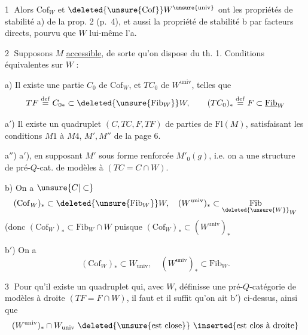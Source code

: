 \textcircled{1} Alors $\mathrm{Cof}_{W}$ et $\deleted{\unsure{\mathrm{Cof}}}W^{\unsure{\mathrm{univ}}}$ ont les
propriétés de stabilité a)  de la
prop. 2 (p.~4), et aussi la propriété de
stabilité b par facteurs directs, pourvu
que $W$ lui-même l'a.

\textcircled{2} Supposons $M$ \uline{accessible}, de sorte qu'on
dispose du th. 1.  Conditions
équivalentes sur $W$ :

a) Il existe une partie  $C_0$ de $\mathrm{Cof}_W$, et $TC_0$ de
$W^{\mathrm{univ}}$, telles que
\[
 TF\overset{\mathrm{def}}{=}C_{0*}\subset\deleted{\unsure{\mathrm{Fib}_W}}W,\qquad
 (TC_0)_*\overset{\mathrm{def}}{=}F\subset\underline{\mathrm{Fib}}_W
\]

a$'$) Il existe un quadruplet $(C,TC,F,TF)$ de
parties de $\mathrm{Fl}(M)$, satisfaisant les conditions
$M1$ à $M4$, $M',M''$ de la page 6.

a$''$)  a$'$), en supposant $M'$ sous forme
renforcée   $M'_0(g)$, i.e. on a une structure
de pré-$Q$-cat. de modèles à  $(TC=C\cap W)$.

b) On a $\unsure{C|\subset}$
\[
 (\mathrm{Cof}_W)_*\subset\deleted{\unsure{\mathrm{Fib}_W}}W,\quad
 (W^{\mathrm{univ}})_*\subset\underset{\deleted{\unsure{W}}}{\mathrm{Fib}}_W
\]
(donc $(\mathrm{Cof}_W)_*\subset\mathrm{Fib}_W\cap W$ puisque
$(\mathrm{Cof}_W)_*\subset(W^{\mathrm{univ}})_*$

b$'$) On a
\[
 (\mathrm{Cof}_W)_*\subset W_{\mathrm{univ}},\quad
 (W^{\mathrm{univ}})_*\subset\mathrm{Fib}_W.
\]

\textcircled{3} Pour qu'il existe un quadruplet qui,
avec $W$, définisse une pré-$Q$-catégorie de
modèles à droite $(TF=F\cap W)$\inserted{\textsuperscript{$*$}}, il faut et
il suffit qu'on ait b$'$) ci-dessus, ainsi que
\[
 (W^{\mathrm{univ}})_*\cap W_{\mathrm{univ}}\ \text{\deleted{\unsure{est close}} \inserted{est clos à droite}}
\]

